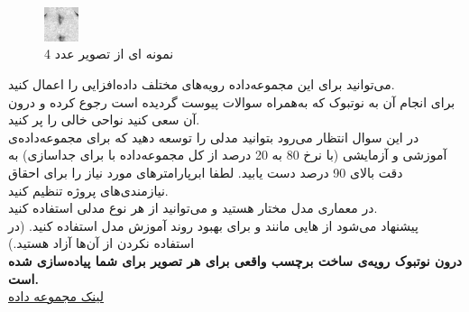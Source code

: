 \documentclass[12pt]{article}
\begin{document}
\begin{enumerate}
    \begin{figure}[h]
        \centering
        \includegraphics[width=1cm]{figs/num_pic.jpg}
        \caption{نمونه ای از تصویر عدد 4}
        \label{fig:num_pic}  
    \end{figure}

    
    می‌توانید برای این مجموعه‌داده رویه‌های مختلف داده‌افزایی را اعمال کنید.\\
    برای انجام آن به نوتبوک  که به‌همراه سوالات پیوست گردیده است رجوع کرده و درون آن سعی کنید نواحی خالی را پر کنید.\\
    در این سوال انتظار می‌رود بتوانید مدلی را توسعه دهید که برای مجموعه‌داده‌ی آموزشی و آزمایشی (با نرخ 80 به 20 درصد از کل مجموعه‌داده با  برای جداسازی) به دقت بالای 90 درصد دست یابید.
    لطفا ابرپارامترهای مورد نیاز را برای احقاق نیازمندی‌های پروژه تنظیم کنید.\\
    در معماری مدل مختار هستید و می‌توانید از هر نوع مدلی استفاده کنید.\\
    پیشنهاد می‌شود از  هایی مانند  و  برای بهبود روند آموزش مدل استفاده کنید. (در استفاده نکردن از آن‌ها آزاد هستید.)\\
    \textbf{درون نوتبوک رویه‌ی ساخت برچسب واقعی برای هر تصویر برای شما پیاده‌سازی شده است.}\\
    \href{https://drive.google.com/drive/folders/1B66Pref_4TTUszYh5Tb08udCIIphXkl9?usp=sharing}{لینک مجموعه داده}



\end{enumerate}
\end{document}
